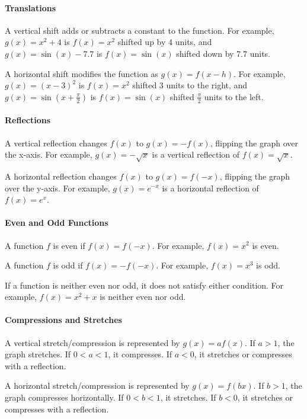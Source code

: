 
\paragraph{Translations}

A vertical shift adds or subtracts a constant to the function. For example, $g(x) = x^2 + 4$ is $f(x) = x^2$ shifted up by 4 units, and $g(x) = \sin(x) - 7.7$ is $f(x) = \sin(x)$ shifted down by 7.7 units.

A horizontal shift modifies the function as $g(x) = f(x - h)$. For example, $g(x) = (x - 3)^2$ is $f(x) = x^2$ shifted 3 units to the right, and $g(x) = \sin(x + \frac{\pi}{2})$ is $f(x) = \sin(x)$ shifted $\frac{\pi}{2}$ units to the left.

\paragraph{Reflections}

A vertical reflection changes $f(x)$ to $g(x) = -f(x)$, flipping the graph over the x-axis. For example, $g(x) = -\sqrt{x}$ is a vertical reflection of $f(x) = \sqrt{x}$.

A horizontal reflection changes $f(x)$ to $g(x) = f(-x)$, flipping the graph over the y-axis. For example, $g(x) = e^{-x}$ is a horizontal reflection of $f(x) = e^x$.

\paragraph{Even and Odd Functions}

A function $f$ is even if $f(x) = f(-x)$. For example, $f(x) = x^2$ is even. 

A function $f$ is odd if $f(x) = -f(-x)$. For example, $f(x) = x^3$ is odd.

If a function is neither even nor odd, it does not satisfy either condition. For example, $f(x) = x^2 + x$ is neither even nor odd.

\paragraph{Compressions and Stretches}

A vertical stretch/compression is represented by $g(x) = af(x)$. If $a > 1$, the graph stretches. If $0 < a < 1$, it compresses. If $a < 0$, it stretches or compresses with a reflection.

A horizontal stretch/compression is represented by $g(x) = f(bx)$. If $b > 1$, the graph compresses horizontally. If $0 < b < 1$, it stretches. If $b < 0$, it stretches or compresses with a reflection.

